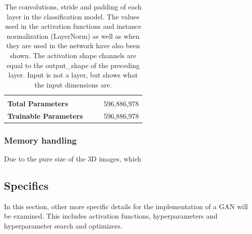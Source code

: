 \documentclass[12pt, fleqn, titlepage]{article}
\begin{document}
\begin{table}[H]
\begin{tabular}{llll}
			&                &             &               \\
			\textbf{Total Parameters}                   &                &             & 596,886,978    \\
			\textbf{Trainable Parameters}               &                &             & 596,886,978    \\ \bottomrule
		\end{tabular}
		\caption{The convolutions, stride and padding of each layer in the classification model. The values used in the activation functions and instance normalization (LayerNorm) as well as when they are used in the network have also been shown. The activation shape channels are equal to the output\_shape of the preceding layer. Input is not a layer, but shows what the input dimensions are.}
\end{table}	

	\subsubsection{Memory handling}
	Due to the pure size of the 3D images, which 

\subsection{Specifics}\label{model_specifics}
In this section, other more specific details for the implementation of a GAN will be examined. This includes activation functions, hyperparameters and hyperparameter search and optimizers.
\end{document}
